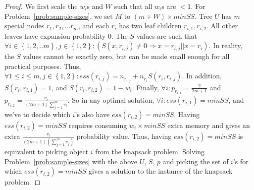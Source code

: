 \documentclass[10pt,journal,compsoc]{IEEEtran}
\newcounter{prob}
\begin{document}
{\begin{proof}
We first scale the $w_i$s and $W$ such that all $w_i$s are $< 1$. For Problem~\ref{prob:sample-sizes}, we set $M$ to $(m + W) \times minSS$. Tree $U$ has $m$ special nodes $r_1, r_2, ... r_m$, and each $r_i$ has two leaf children $r_{i,1}, r_{i,2}$. All other leaves have expansion probability $0$. 
The $S$ values are such that $\forall i \in \left\lbrace 1, 2, ..m\right\rbrace, j \in \left\lbrace 1, 2 \right\rbrace : (S(x, r_{i,j}) \neq 0 \Rightarrow x = r_{i,j} || x = r_i)$. In reality, the $S$ values cannot be exactly zero, but can be made small enough for all practical purposes. Thus, $\forall 1 \leq i \leq m, j \in \left\lbrace 1,2 \right\rbrace : ess(r_{i,j}) = n_{r_{i,j}} + n_{r_i}S(r_i, r_{i,j})$. In addition, $S(r_i, r_{i,1}) = 1$, and $S(r_i, r_{i,2}) = 1 - w_i$. Finally, $\forall i : p_{r_{i,1}} = \frac{2}{2m+1}$ and $p_{r_{i,2}} = \frac{v_i}{(2m+1)\sum_{j=1}^{m}v_i}$. So in any optimal solution, $\forall i : ess(r_{i,1}) = minSS$, and we've to decide which $i$'s also have $ess(r_{i,2}) = minSS$. Having $ess(r_{i,2}) = minSS$ requires consuming $w_i \times minSS$ extra memory and gives an extra $\frac{v_i}{(2m+1)(\sum_{j=1}^{m}v_j)}$ probability value. Thus, having $ess(r_{i,2}) = minSS$ is equivalent to picking object $i$ from the knapsack problem. Solving Problem~\ref{prob:sample-sizes} with the above $U$, $S$, $p$ and picking the set of $i$'s for which $ess(r_{i,2}) = minSS$ gives a solution to the instance of the knapsack problem. 
\end{proof}
}
\end{document}
